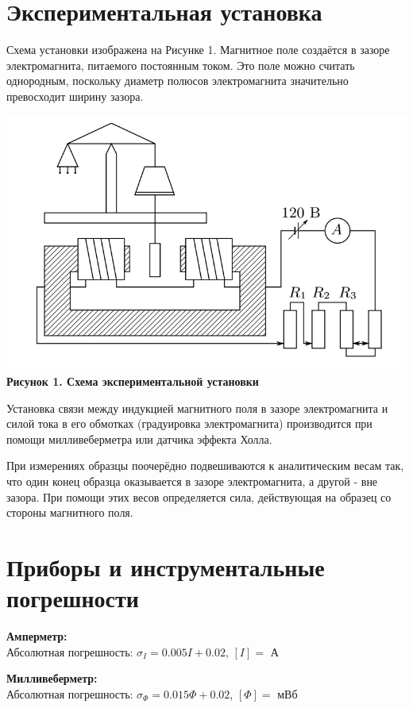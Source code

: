 \documentclass[15pt,a5paper,reqno]{article}
\begin{document}
\section{Экспериментальная установка}

    Схема установки изображена на Рисунке 1. Магнитное поле создаётся в зазоре электромагнита, питаемого постоянным током. Это поле можно считать однородным, поскольку диаметр полюсов электромагнита значительно превосходит ширину зазора.

    \begin{center}
        \includegraphics[width = \textwidth]{images/picture_1.png}
        \textbf{Рисунок 1. Схема экспериментальной установки}
    \end{center}

    Установка связи между индукцией магнитного поля в зазоре электромагнита и силой тока в его обмотках (градуировка электромагнита) производится при помощи милливеберметра или датчика эффекта Холла.

    При измерениях образцы поочерёдно подвешиваются к аналитическим весам так, что один конец образца оказывается в зазоре электромагнита, а другой - вне зазора. При помощи этих весов определяется сила, действующая на образец со стороны магнитного поля.
    
\section{Приборы и инструментальные погрешности}

    \noindent\textbf{Амперметр:}\\
        Абсолютная погрешность: $\sigma_I = 0.005 I + 0.02$, $[I] = \text{ А}$

    \noindent\textbf{Милливеберметр:}\\
        Абсолютная погрешность: $\sigma_{\Phi} = 0.015\Phi + 0.02$, $[\Phi] = \text{ мВб}$
\end{document}
